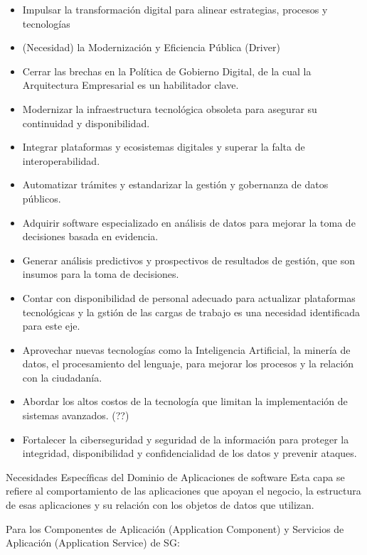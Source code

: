\documentclass[
	a4paper, %
	12pt, %
]{include/CSSullivanBusinessReport}
\begin{document}
\begin{itemize}
\item
  Impulsar la transformación digital para alinear estrategias, procesos
  y tecnologías
\item
  (Necesidad) la Modernización y Eficiencia Pública (Driver)
\item
  Cerrar las brechas en la Política de Gobierno Digital, de la cual la
  Arquitectura Empresarial es un habilitador clave.
\item
  Modernizar la infraestructura tecnológica obsoleta para asegurar su
  continuidad y disponibilidad.
\item
  Integrar plataformas y ecosistemas digitales y superar la falta de
  interoperabilidad.
\item
  Automatizar trámites y estandarizar la gestión y gobernanza de datos
  públicos.
\item
  Adquirir software especializado en análisis de datos para mejorar la
  toma de decisiones basada en evidencia.
\item
  Generar análisis predictivos y prospectivos de resultados de gestión,
  que son insumos para la toma de decisiones.
\item
  Contar con disponibilidad de personal adecuado para actualizar
  plataformas tecnológicas y la gstión de las cargas de trabajo es una
  necesidad identificada para este eje.
\item
  Aprovechar nuevas tecnologías como la Inteligencia Artificial, la
  minería de datos, el procesamiento del lenguaje, para mejorar los
  procesos y la relación con la ciudadanía.
\item
  Abordar los altos costos de la tecnología que limitan la
  implementación de sistemas avanzados. (??)
\item
  Fortalecer la ciberseguridad y seguridad de la información para
  proteger la integridad, disponibilidad y confidencialidad de los datos
  y prevenir ataques.
\end{itemize}

Necesidades Específicas del Dominio de Aplicaciones de software Esta
capa se refiere al comportamiento de las aplicaciones que apoyan el
negocio, la estructura de esas aplicaciones y su relación con los
objetos de datos que utilizan.

Para los Componentes de Aplicación (Application Component) y Servicios
de Aplicación (Application Service) de SG:
\end{document}
